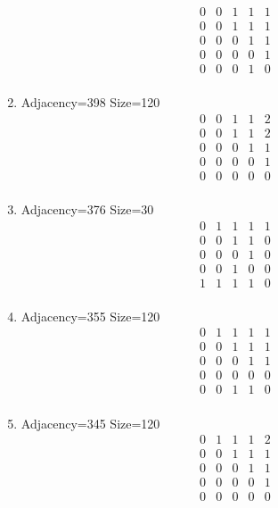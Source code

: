 \documentclass[12pt]{article}
\begin{document}
\begin{multicols}{3}
\begin{enumerate}
\begin{equation*}
\begin{array}{ccccc}
0&0&1&1&1\\
0&0&1&1&1\\
0&0&0&1&1\\
0&0&0&0&1\\
0&0&0&1&0\\
\end{array}
\end{equation*}
\item Adjacency=398 Size=120
\begin{equation*}
\begin{array}{ccccc}
0&0&1&1&2\\
0&0&1&1&2\\
0&0&0&1&1\\
0&0&0&0&1\\
0&0&0&0&0\\
\end{array}
\end{equation*}
\item Adjacency=376 Size=30
\begin{equation*}
\begin{array}{ccccc}
0&1&1&1&1\\
0&0&1&1&0\\
0&0&0&1&0\\
0&0&1&0&0\\
1&1&1&1&0\\
\end{array}
\end{equation*}
\item Adjacency=355 Size=120
\begin{equation*}
\begin{array}{ccccc}
0&1&1&1&1\\
0&0&1&1&1\\
0&0&0&1&1\\
0&0&0&0&0\\
0&0&1&1&0\\
\end{array}
\end{equation*}
\item Adjacency=345 Size=120
\begin{equation*}
\begin{array}{ccccc}
0&1&1&1&2\\
0&0&1&1&1\\
0&0&0&1&1\\
0&0&0&0&1\\
0&0&0&0&0\\
\end{array}
\end{equation*}

\end{enumerate}
\end{multicols}
\end{document}
